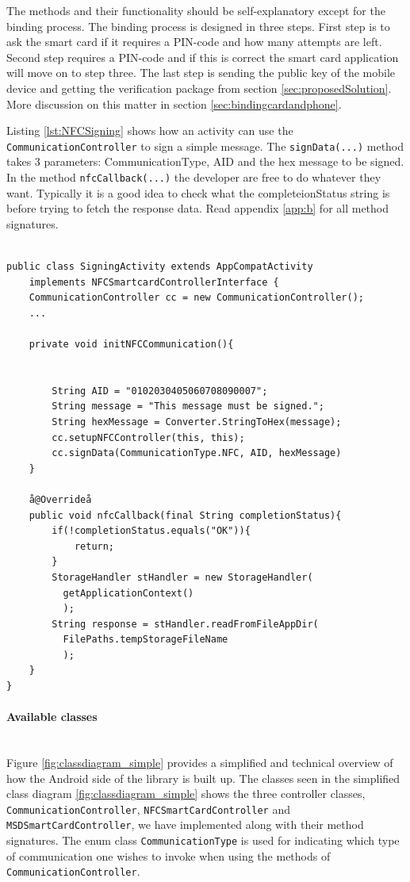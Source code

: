 The methods and their functionality should be self-explanatory except for the binding process. The binding process is designed in three steps. First step is to ask the smart card if it requires a PIN-code and how many attempts are left. Second step requires a PIN-code and if this is correct the smart card application will move on to step three. The last step is sending the public key of the mobile device and getting the verification package from section \ref{sec:proposedSolution}. More discussion on this matter in section \ref{sec:bindingcardandphone}.

Listing \ref{lst:NFCSigning} shows how an activity can use the \texttt{CommunicationController} to sign a simple message. The \texttt{signData(...)} method takes 3 parameters: CommunicationType, AID and the hex message to be signed. In the method \texttt{nfcCallback(...)} the developer are free to do whatever they want. Typically it is a good idea to check what the completeionStatus string is before trying to fetch the response data. Read appendix \ref{app:b} for all method signatures.

\begin{lstlisting}[caption=Java code example showing how to send sign a message using a NFC smart card., label=lst:NFCSigning,escapechar=å]

public class SigningActivity extends AppCompatActivity
    implements NFCSmartcardControllerInterface {
    CommunicationController cc = new CommunicationController();
    ...

    private void initNFCCommunication(){


        String AID = "0102030405060708090007";
        String message = "This message must be signed.";
        String hexMessage = Converter.StringToHex(message);
        cc.setupNFCController(this, this);
        cc.signData(CommunicationType.NFC, AID, hexMessage)
    }

    å@Overrideå
    public void nfcCallback(final String completionStatus){
        if(!completionStatus.equals("OK")){
            return;
        }
        StorageHandler stHandler = new StorageHandler(
          getApplicationContext()
          );
        String response = stHandler.readFromFileAppDir(
          FilePaths.tempStorageFileName
          );
    }
}

\end{lstlisting}

\paragraph{Available classes}\mbox{}\\
Figure \ref{fig:classdiagram_simple} provides a simplified and technical overview of how the Android side of the library is built up. The classes seen in the simplified class diagram \ref{fig:classdiagram_simple} shows the three controller classes, \texttt{CommunicationController}, \texttt{NFCSmartCardController} and \texttt{MSDSmartCardController}, we have implemented along with their method signatures. The enum class \texttt{CommunicationType} is used for indicating which type of communication one wishes to invoke when using the methods of \texttt{CommunicationController}.

